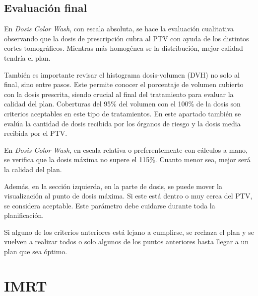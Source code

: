 \documentclass{article}
\begin{document}
\subsection{Evaluación final}

En \textit{Dosis Color Wash}, con escala absoluta, se hace la evaluación cualitativa observando que la dosis de prescripción cubra al PTV con ayuda de los distintos cortes tomográficos. Mientras más homogénea se la distribución, mejor calidad tendría el plan.

También es importante revisar el histograma dosis-volumen (DVH) no solo al final, sino entre pasos. Este permite conocer el porcentaje de volumen cubierto con la dosis prescrita, siendo crucial al final del tratamiento para evaluar la calidad del plan. Coberturas del 95\% del volumen con el 100\% de la dosis son criterios aceptables en este tipo de tratamientos. En este apartado también se evalúa la cantidad de dosis recibida por los órganos de riesgo y la dosis media recibida por el PTV.

En \textit{Dosis Color Wash}, en escala relativa o preferentemente con cálculos a mano, se verifica que la dosis máxima no supere el 115\%. Cuanto menor sea, mejor será la calidad del plan.

Además, en la sección izquierda, en la parte de dosis, se puede mover la visualización al punto de dosis máxima. Si este está dentro o muy cerca del PTV, se considera aceptable. Este parámetro debe cuidarse durante toda la planificación.

Si alguno de los criterios anteriores está lejano a cumplirse, se rechaza el plan y se vuelven a realizar todos o solo algunos de los puntos anteriores hasta llegar a un plan que sea óptimo.

\vspace{3pt}


\section{IMRT}
\end{document}

